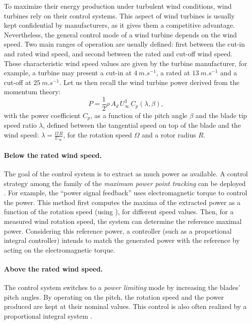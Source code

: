 To maximize their energy production under turbulent wind conditions, wind turbines rely on their control systems. 
This aspect of wind turbines is usually kept confidential by manufacturers, as it gives them a competitive advantage.  
Nevertheless, the general control mode of a wind turbine depends on the wind speed. 
Two main ranges of operation are usually defined: first between the cut-in and rated wind speed, and second between the rated and cut-off wind speed. 
These characteristic wind speed values are given by the turbine manufacturer, for example, a turbine may present a cut-in at $4~\si{m.s^{-1}}$, a rated at $13~\si{m.s^{-1}}$ and a cut-off at $25~\si{m.s^{-1}}$. 
Let us then recall the wind turbine power derived from the momentum theory: 
\begin{equation}
    P = \frac12 \rho \, A_d \, U_\infty^3 \, C_p(\lambda, \beta), 
    \label{eq:power_wt}
\end{equation}
with the power coefficient $C_p$, as a function of the pitch angle $\beta$ and the blade tip speed ratio $\lambda$, defined between the tangential speed on top of the blade and the wind speed: $\lambda = \frac{\Omega \, R}{U_\infty}$, for the rotation speed $\Omega$ and a rotor radius $R$. 

\paragraph{Below the rated wind speed.}
The goal of the control system is to extract as much power as available. 
A control strategy among the family of the \textit{maximum power point tracking} can be deployed \citep{abdullah_2012_control_review}.   
For example, the ``power signal feedback'' uses electromagnetic torque to control the power. 
This method first computes the maxima of the extracted power as a function of the rotation speed (using ), for different speed values. 
Then, for a measured wind rotation speed, the system can determine the reference maximal power. 
Considering this reference power, a controller (such as a proportional integral controller) intends to match the generated power with the reference by acting on the electromagnetic torque. 


\paragraph{Above the rated wind speed.}
The control system switches to a \textit{power limiting} mode by increasing the blades' pitch angles. 
By operating on the pitch, the rotation speed and the power produced are kept at their nominal values. 
This control is also often realized by a proportional integral system \citep{bossanyi_2003_pitch_control}. 

